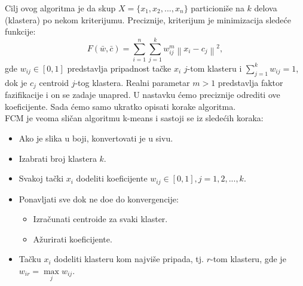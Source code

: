\documentclass[12pt,a4paper]{article}
\theoremstyle{definition}
\theoremstyle{remark}
\theoremstyle{plain}
\begin{document}
Cilj ovog algoritma je da skup $X=\{x_{1}, x_{2}, ..., x_{n}\}$ particioni\v se na $k$ delova (klastera) po 
nekom kriterijumu. Preciznije, kriterijum je minimizacija slede\' ce funkcije:
\begin{equation*}
 F(\bar{w}, \bar{c}) = \sum_{i=1}^{n}\sum_{j=1}^{k}w_{ij}^{m}\left\|x_{i}-c_{j}\right\|^{2},
\end{equation*}
gde $w_{ij}\in [0, 1]$ predstavlja pripadnost ta\v cke $x_{i}$ $j$-tom klasteru i $\sum_{j=1}^{k}w_{ij}=1$, dok je $c_{j}$ centroid $j$-tog klastera. Realni parametar $m>1$ predstavlja faktor fazifikacije i on se zadaje unapred.
U nastavku \' cemo preciznije odrediti ove koeficijente. Sada \' cemo samo ukratko opisati korake algoritma.\\

FCM je veoma sli\v can algoritmu k-means i sastoji se iz slede\' cih koraka:
\begin{itemize}
  \item Ako je slika u boji, konvertovati je u sivu. 
  \item Izabrati broj klastera $k$.
  \item Svakoj ta\v cki $x_{i}$ dodeliti koeficijente $w_{ij} \in [0, 1], j=1,2,..., k$.
  \item Ponavljati sve dok ne do\dj e do konvergencije:
    \begin{itemize}
      \item Izra\v cunati centroide za svaki klaster.
      \item A\v zurirati koeficijente.
    \end{itemize}
  \item Ta\v cku $x_{i}$ dodeliti klasteru kom najvi\v se pripada, tj. $r$-tom klasteru, gde je $w_{ir}=\max\limits_{j} w_{ij}$.
\end{itemize}
\end{document}
